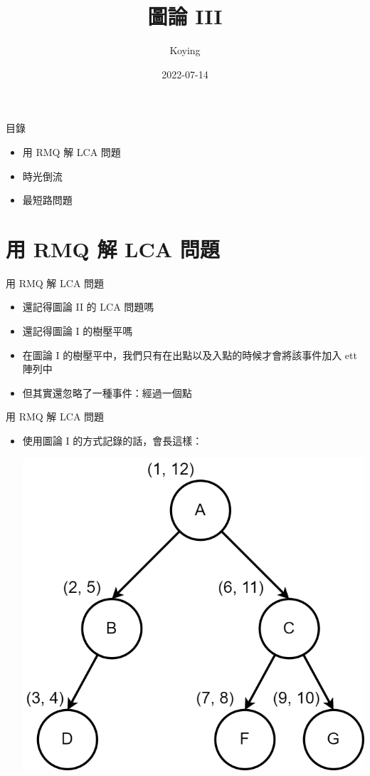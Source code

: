 \documentclass[aspectratio=169]{beamer}
\title{圖論 III}
\author{Koying}
\date{2022-07-14}
\begin{document}
    \begin{frame}
        \titlepage
    \end{frame}

    \begin{frame}{目錄}
        \begin{itemize}
            \item 用 RMQ 解 LCA 問題
            \item 時光倒流
            \item 最短路問題
        \end{itemize}
    \end{frame}

    \section{用 RMQ 解 LCA 問題}

    \begin{frame}{用 RMQ 解 LCA 問題}
        \begin{itemize}
            \item<1-> 還記得圖論 II 的 LCA 問題嗎
            \item<2-> 還記得圖論 I 的樹壓平嗎
            \item<3-> 在圖論 I 的樹壓平中，我們只有在出點以及入點的時候才會將該事件加入 ett 陣列中
            \item<3-> 但其實還忽略了一種事件：經過一個點
        \end{itemize}
    \end{frame}

    \begin{frame}{用 RMQ 解 LCA 問題}
        \begin{itemize}
            \item 使用圖論 I 的方式記錄的話，會長這樣：
            \begin{center}
                \includegraphics[height=0.7\textheight]{src/ett_1.png}
            \end{center}
        \end{itemize}
    \end{frame}
\end{document}

